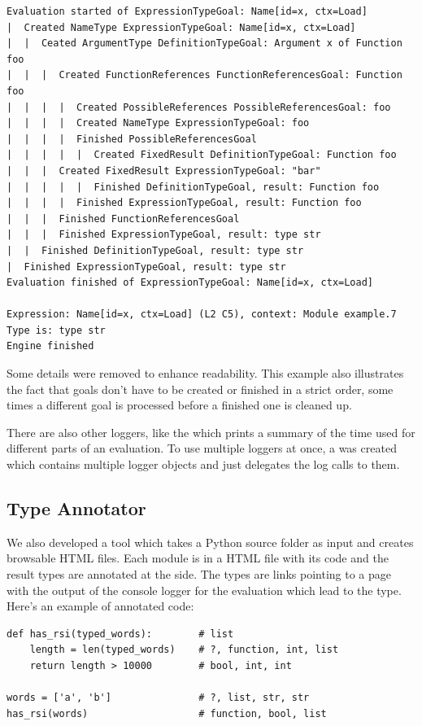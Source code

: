 \documentclass[12pt,halfparskip,DIV11,BCOR10mm]{scrreprt}
\begin{document}
\begin{verbatim}
Evaluation started of ExpressionTypeGoal: Name[id=x, ctx=Load]
|  Created NameType ExpressionTypeGoal: Name[id=x, ctx=Load]
|  |  Ceated ArgumentType DefinitionTypeGoal: Argument x of Function foo
|  |  |  Created FunctionReferences FunctionReferencesGoal: Function foo
|  |  |  |  Created PossibleReferences PossibleReferencesGoal: foo
|  |  |  |  Created NameType ExpressionTypeGoal: foo
|  |  |  |  Finished PossibleReferencesGoal
|  |  |  |  |  Created FixedResult DefinitionTypeGoal: Function foo
|  |  |  Created FixedResult ExpressionTypeGoal: "bar"
|  |  |  |  |  Finished DefinitionTypeGoal, result: Function foo
|  |  |  |  Finished ExpressionTypeGoal, result: Function foo
|  |  |  Finished FunctionReferencesGoal
|  |  |  Finished ExpressionTypeGoal, result: type str
|  |  Finished DefinitionTypeGoal, result: type str
|  Finished ExpressionTypeGoal, result: type str
Evaluation finished of ExpressionTypeGoal: Name[id=x, ctx=Load]

Expression: Name[id=x, ctx=Load] (L2 C5), context: Module example.7
Type is: type str
Engine finished
\end{verbatim}

Some details were removed to enhance readability. This example also illustrates the fact that goals don't have to be created or finished in a strict order, some times a different goal is processed before a finished one is cleaned up.

There are also other loggers, like the  which prints a summary of the time used for different parts of an evaluation. To use multiple loggers at once, a  was created which contains multiple logger objects and just delegates the log calls to them.

\subsection{Type Annotator}

We also developed a tool which takes a Python source folder as input and creates browsable HTML files. Each module is in a HTML file with its code and the result types are annotated at the side. The types are links pointing to a page with the output of the console logger for the evaluation which lead to the type. Here's an example of annotated code:

\begin{lstlisting}
def has_rsi(typed_words):        # list
    length = len(typed_words)    # ?, function, int, list
    return length > 10000        # bool, int, int

words = ['a', 'b']               # ?, list, str, str
has_rsi(words)                   # function, bool, list
\end{lstlisting}
\end{document}
